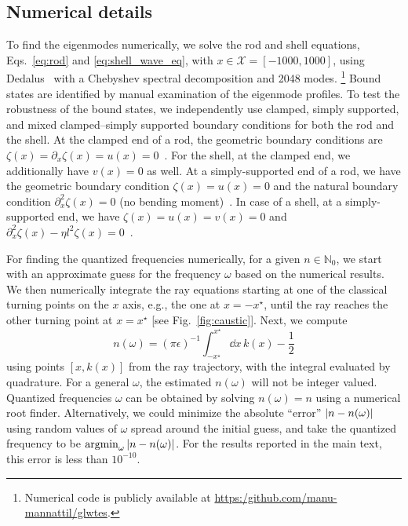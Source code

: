 \begin{subappendices}
\section{Numerical details}
\label{app:numerical}


To find the eigenmodes numerically, we solve the rod and shell equations, Eqs.~\eqref{eq:rod} and \eqref{eq:shell_wave_eq}, with $x \in \mathcal{X} = [-1000, 1000]$, using Dedalus~\cite{burns2020} with a Chebyshev spectral decomposition and 2048 modes.%
\footnote{Numerical code is publicly available at \url{https:/github.com/manu-mannattil/glwtes}.}
Bound states are identified by manual examination of the eigenmode profiles.
To test the robustness of the bound states, we independently use clamped, simply supported, and mixed clamped--simply supported boundary conditions for both the rod and the shell.
At the clamped end of a rod, the geometric boundary conditions are $\zeta(x) = \partial_{x}\zeta(x) = u(x) = 0$~\cite{kernes2021}.
For the shell, at the clamped end, we additionally have $v(x) = 0$ as well.
At a simply-supported end of a rod, we have the geometric boundary condition $\zeta(x) = u(x) = 0$ and the natural boundary condition $\partial_{x}^{2}\zeta(x) = 0$ (no bending moment)~\cite{fung1965}.
In case of a shell, at a simply-supported end, we have $\zeta(x) = u(x) = v(x) = 0$ and $\partial_{x}^{2}\zeta(x) - \eta l^{2}\zeta(x) = 0$~\cite{yu1955}.


For finding the quantized frequencies numerically, for a given $n \in \mathbb{N}_{0}$, we start with an approximate guess for the frequency $\omega$ based on the numerical results.
We then numerically integrate the ray equations starting at one of the classical turning points on the $x$ axis, e.g., the one at $x = -x^{\star}$, until the ray reaches the other turning point at $x = x^{\star}$ [see Fig.~\ref{fig:caustic}].
Next, we compute
%
\begin{equation}
  n(\omega) = (\pi\epsilon)^{-1} \int_{-x^{\star}}^{x^{\star}} \dd{x}\,k(x) - \frac{1}{2}
\end{equation}
%
using points $\left[x, k(x)\right]$ from the ray trajectory, with the integral evaluated by quadrature.
For a general $\omega$, the estimated $n(\omega)$ will not be integer valued.
Quantized frequencies $\omega$ can be obtained by solving $n(\omega) = n$ using a numerical root finder.
Alternatively, we could minimize the absolute ``error'' $\lvert n - n(\omega)\rvert$ using random values of $\omega$ spread around the initial guess, and take the quantized frequency to be $\operatorname*{argmin}_{\omega}\,\lvert n - n(\omega)\rvert$.
For the results reported in the main text, this error is less than $10^{-10}$.

\end{subappendices}
